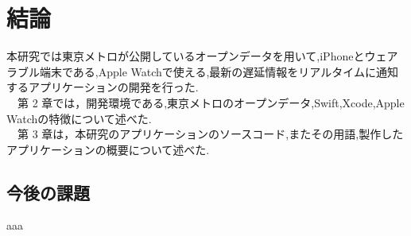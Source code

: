 \chapter{結論}

本研究では東京メトロが公開しているオープンデータを用いて,iPhoneとウェアラブル端末である,Apple Watchで使える,最新の遅延情報をリアルタイムに通知するアプリケーションの開発を行った.\\
　第 2 章では，開発環境である,東京メトロのオープンデータ,Swift,Xcode,Apple Watchの特徴について述べた.\\
　第 3 章は，本研究のアプリケーションのソースコード,またその用語,製作したアプリケーションの概要について述べた.\\
\newpage

\section{今後の課題}
aaa\\